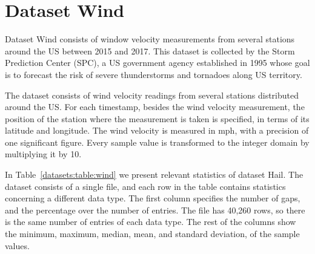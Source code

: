 
\vspace{-15pt}
\section{Dataset Wind}
\label{datasets:wind}

Dataset Wind \cite{dataset:spc} consists of window velocity measurements from several stations around the US between 2015 and 2017. This dataset is collected by the Storm Prediction Center (SPC), a US government agency established in 1995 whose goal is to forecast the risk of severe thunderstorms and tornadoes along US territory.


The dataset consists of wind velocity readings from several stations distributed around the US. For each timestamp, besides the wind velocity measurement, the position of the station where the measurement is taken is specified, in terms of its latitude and longitude. The wind velocity is measured in mph, with a precision of one significant figure. Every sample value is transformed to the integer domain by multiplying it by 10.


In Table~\ref{datasets:table:wind} we present relevant statistics of dataset Hail. The dataset consists of a single file, and each row in the table contains statistics concerning a different data type. The first column specifies the number of gaps, and the percentage over the number of entries. The file has 40,260 rows, so there is the same number of entries of each data type. The rest of the columns show the minimum, maximum, median, mean, and standard deviation, of the sample values.


